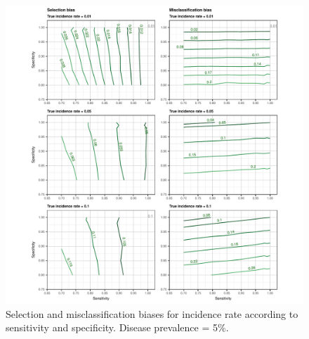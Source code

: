 \documentclass[utf8]{frontiers_suppmat} %
\begin{document}
\begin{figure}[htbp]
  \begin{center}
    \includegraphics[scale=.95]{master-incidence5_contourX-1}
    \end{center}
  \caption{Selection and misclassification biases for incidence rate according
    to sensitivity and specificity. Disease prevalence = 5\%.}
  \label{fig:incidence_contourX5}
\end{figure}
\end{document}
